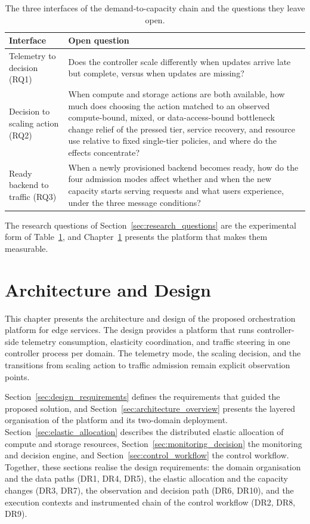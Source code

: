 ﻿\documentclass[12pt,reqno,twoside]{amsbook}
\begin{document}
\begin{table}[htbp]
    \centering
    \caption{The three interfaces of the demand-to-capacity chain and
    the questions they leave open.}
    \label{tab:interface_gaps}
    \begin{tabular}{p{} p{}}
        \toprule
        Interface & Open question \\
        \midrule
        Telemetry to decision (RQ1) &
        Does the controller scale differently when updates
        arrive late but complete, versus when updates are
        missing? \\
        Decision to scaling action (RQ2) &
        When compute and storage actions are both available, how much does
        choosing the action matched to an observed compute-bound, mixed, or
        data-access-bound bottleneck change relief of the pressed tier,
        service recovery, and resource use relative to fixed single-tier
        policies, and where do the effects concentrate? \\
        Ready backend to traffic (RQ3) &
        When a newly provisioned backend becomes ready, how do the four
        admission modes affect whether and when the new capacity starts
        serving requests and what users experience, under the three message
        conditions? \\
        \bottomrule
    \end{tabular}
\end{table}

The research questions of Section~\ref{sec:research_questions} are the
experimental form of Table~\ref{tab:interface_gaps}, and
Chapter~\ref{ch:system_architecture} presents the platform that makes them
measurable.


\chapter{Architecture and Design}\label{ch:system_architecture}
This chapter presents the architecture and design of the proposed
orchestration platform for edge services.
The design provides a platform that runs controller-side telemetry
consumption, elasticity coordination, and traffic steering in one controller
process per domain. The telemetry mode, the scaling decision,
and the transitions from scaling action to traffic admission
remain explicit observation points. 

Section~\ref{sec:design_requirements} defines the requirements that guided
the proposed solution, and Section~\ref{sec:architecture_overview} presents
the layered organisation of the platform and its two-domain deployment.
Section~\ref{sec:elastic_allocation} describes the distributed elastic
allocation of compute and storage resources, Section~\ref{sec:monitoring_decision}
the monitoring and decision engine, and Section~\ref{sec:control_workflow}
the control workflow. Together, these sections realise the design
requirements: the domain organisation and the data paths (DR1, DR4, DR5),
the elastic allocation and the capacity changes (DR3, DR7), the
observation and decision path (DR6, DR10), and the execution contexts and
instrumented chain of the control workflow (DR2, DR8, DR9).
\end{document}
